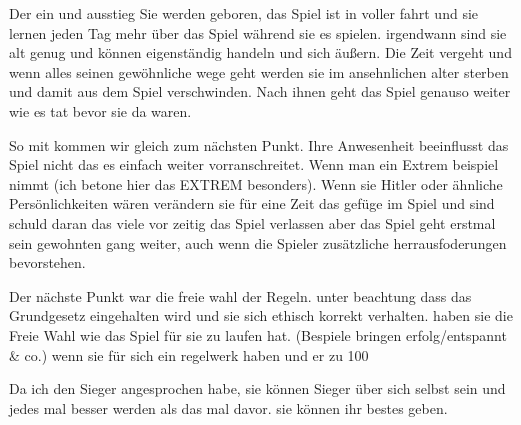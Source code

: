     Der ein und ausstieg 
        Sie werden geboren, das Spiel ist in voller fahrt und sie lernen jeden Tag mehr über das Spiel während sie es spielen. irgendwann sind sie alt genug und können eigenständig handeln und sich äußern.
        Die Zeit vergeht und wenn alles seinen gewöhnliche wege geht werden sie im ansehnlichen alter sterben und damit aus dem Spiel verschwinden. Nach ihnen geht das Spiel genauso weiter wie es tat bevor sie da waren.

    So mit kommen wir gleich zum nächsten Punkt. Ihre Anwesenheit beeinflusst das Spiel nicht das es einfach weiter vorranschreitet. Wenn man ein Extrem beispiel nimmt (ich betone hier das EXTREM besonders). Wenn sie Hitler oder ähnliche Persönlichkeiten wären verändern sie für eine Zeit das gefüge im Spiel und sind schuld daran das viele vor zeitig das Spiel verlassen aber das Spiel geht erstmal sein gewohnten gang weiter, auch wenn die Spieler zusätzliche herrausfoderungen bevorstehen. 

    Der nächste Punkt war die freie wahl der Regeln.  unter beachtung dass das Grundgesetz eingehalten wird und sie sich ethisch korrekt verhalten. haben sie die Freie Wahl wie das Spiel für sie zu laufen hat. (Bespiele bringen erfolg/entspannt & co.)
        wenn sie für sich ein regelwerk haben und er zu 100%

    Da ich den Sieger angesprochen habe, sie können Sieger über sich selbst sein und jedes mal besser werden als das mal davor. sie können ihr bestes geben. 
